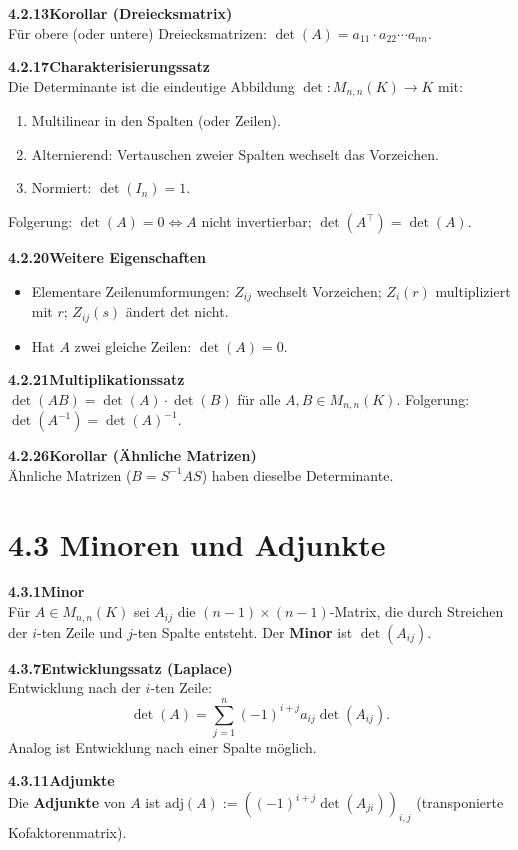 \documentclass[a4paper,12pt]{article}
\newcommand{\gentry}[3]{%
  \noindent\textbf{#1\quad #2}\nopagebreak\\[0.2em]
  #3\par\smallskip
}
\begin{document}
\gentry{4.2.13}{Korollar (Dreiecksmatrix)}{%
  Für obere (oder untere) Dreiecksmatrizen: $\det(A) = a_{11} \cdot a_{22} \cdots a_{nn}$.
}

\gentry{4.2.17}{Charakterisierungssatz}{%
  Die Determinante ist die eindeutige Abbildung $\det: M_{n,n}(K) \to K$ mit:
  \begin{enumerate}[label=(\roman*), topsep=2pt, itemsep=1pt]
    \item Multilinear in den Spalten (oder Zeilen).
    \item Alternierend: Vertauschen zweier Spalten wechselt das Vorzeichen.
    \item Normiert: $\det(I_n) = 1$.
  \end{enumerate}
  Folgerung: $\det(A) = 0 \iff A$ nicht invertierbar; $\det(A^\top) = \det(A)$.
}

\gentry{4.2.20}{Weitere Eigenschaften}{%
  \begin{itemize}[topsep=2pt, itemsep=1pt]
    \item Elementare Zeilenumformungen: $Z_{ij}$ wechselt Vorzeichen; $Z_i(r)$ multipliziert mit $r$; $Z_{ij}(s)$ ändert det nicht.
    \item Hat $A$ zwei gleiche Zeilen: $\det(A) = 0$.
  \end{itemize}
}

\gentry{4.2.21}{Multiplikationssatz}{%
  $\det(AB) = \det(A) \cdot \det(B)$ für alle $A, B \in M_{n,n}(K)$.
  Folgerung: $\det(A^{-1}) = \det(A)^{-1}$.
}

\gentry{4.2.26}{Korollar (Ähnliche Matrizen)}{%
  Ähnliche Matrizen ($B = S^{-1}AS$) haben dieselbe Determinante.
}

\section*{4.3 \quad Minoren und Adjunkte}

\gentry{4.3.1}{Minor}{%
  Für $A \in M_{n,n}(K)$ sei $A_{ij}$ die $(n{-}1){\times}(n{-}1)$-Matrix, die durch Streichen der $i$-ten Zeile und $j$-ten Spalte entsteht. Der \textbf{Minor} ist $\det(A_{ij})$.
}

\gentry{4.3.7}{Entwicklungssatz (Laplace)}{%
  Entwicklung nach der $i$-ten Zeile:
  \[
    \det(A) = \sum_{j=1}^n (-1)^{i+j} a_{ij} \det(A_{ij}).
  \]
  Analog ist Entwicklung nach einer Spalte möglich.
}

\gentry{4.3.11}{Adjunkte}{%
  Die \textbf{Adjunkte} von $A$ ist $\mathrm{adj}(A) := ((-1)^{i+j}\det(A_{ji}))_{i,j}$ (transponierte Kofaktorenmatrix).
}
\end{document}
